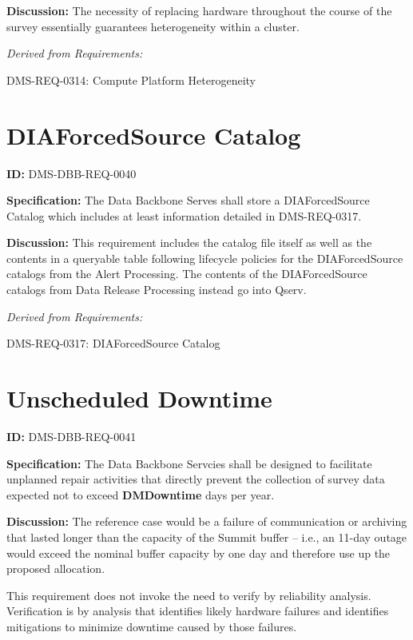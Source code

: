 \documentclass[SE,toc,lsstdraft]{lsstdoc}
\begin{document}
\textbf{Discussion:}
The necessity of replacing hardware throughout the course of the survey essentially guarantees heterogeneity within a cluster.

\emph{Derived from Requirements:}

DMS-REQ-0314:
Compute Platform Heterogeneity \newline

\section{DIAForcedSource Catalog}

\label{DMS-DBB-REQ-0040}
\textbf{ID:} DMS-DBB-REQ-0040

\textbf{Specification:}
The Data Backbone Serves shall store a DIAForcedSource Catalog which includes at least information detailed in DMS-REQ-0317.

\textbf{Discussion:}
This requirement includes the catalog file itself as well as the contents in a queryable table following lifecycle policies for the DIAForcedSource catalogs from the Alert Processing.  The contents of the DIAForcedSource catalogs from Data Release Processing instead go into Qserv.

\emph{Derived from Requirements:}

DMS-REQ-0317:
DIAForcedSource Catalog \newline

\section{Unscheduled Downtime}

\label{DMS-DBB-REQ-0041}
\textbf{ID:} DMS-DBB-REQ-0041

\textbf{Specification:}
The Data Backbone Servcies shall be designed to facilitate unplanned repair activities that directly prevent the collection of survey data expected not to exceed \textbf{DMDowntime} days per year.

\textbf{Discussion:}
The reference case would be a failure of communication or archiving that lasted longer than the capacity of the Summit buffer -- i.e., an 11-day outage would exceed the nominal buffer capacity by one day and therefore use up the proposed allocation.

This requirement does not invoke the need to verify by reliability analysis. Verification is by analysis that identifies likely hardware failures and identifies mitigations to minimize downtime caused by those failures.
\end{document}
